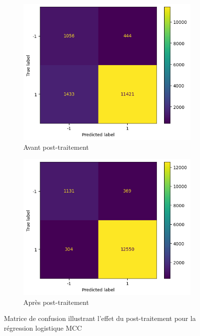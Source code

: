 \documentclass{article}
\begin{document}
\begin{figure}[htbp]
  \centering
  \begin{subfigure}[b]{0.45\textwidth}
    \includegraphics[width=\textwidth]{src/locuteur/confusion_matrix_no_post.png}
    \caption{Avant post-traitement}
    \label{fig:image1}
  \end{subfigure}
  \begin{subfigure}[b]{0.45\textwidth}
    \includegraphics[width=\textwidth]{src/locuteur/confusion_matrix_with_post.png}
    \caption{Après post-traitement}
    \label{fig:image2}
  \end{subfigure}
  \caption{Matrice de confusion illustrant l'effet du post-traitement pour la régression logistique MCC}
  \label{fig:two_confusion_matrix}
\end{figure}
\end{document}

